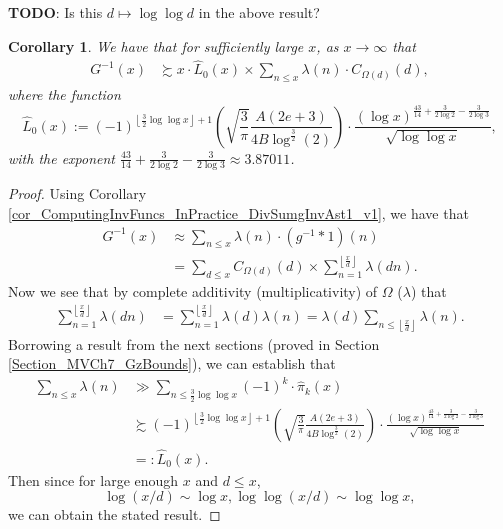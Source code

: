\documentclass[11pt,reqno,a4letter]{article}
\numberwithin{figure}{section}
\numberwithin{table}{section}
\newcommand{\floor}[1]{\left\lfloor #1 \right\rfloor}
\newcommand{\Floor}[2]{\ensuremath{\left\lfloor \frac{#1}{#2} \right\rfloor}}
\theoremstyle{plain}
\newtheorem{cor}[theorem]{Corollary}
\numberwithin{theorem}{section}
\theoremstyle{definition}
\begin{document}
\textbf{TODO}: Is this $d \mapsto \log\log d$ in the above result? 

\begin{cor} 
\label{cor_ASemiForm_ForGInvx_v1} 
We have that for sufficiently large $x$, as $x \rightarrow \infty$ that 
\begin{align*} 
G^{-1}(x) & \succsim x \cdot \widehat{L}_0(x) \times \sum_{n \leq x} 
     \lambda(n) \cdot C_{\Omega(d)}(d), 
\end{align*} 
where the function 
\[
\widehat{L}_0(x) := (-1)^{\floor{\frac{3}{2} \log\log x} + 1} \left( 
     \sqrt{\frac{3}{\pi}} \frac{A (2e+3)}{4B \log^{\frac{3}{2}}(2)}\right) \cdot 
     \frac{(\log x)^{\frac{43}{14} + \frac{3}{2 \log 2} - \frac{3}{2 \log 3}}}{ 
     \sqrt{\log\log x}}, 
\]
with the exponent $\frac{43}{14} + \frac{3}{2 \log 2} - \frac{3}{2 \log 3} \approx 3.87011$. 
\end{cor} 
\begin{proof} 
Using Corollary \ref{cor_ComputingInvFuncs_InPractice_DivSumgInvAst1_v1}, we have that 
\begin{align*} 
G^{-1}(x) & \approx \sum_{n \leq x} \lambda(n) \cdot (g^{-1} \ast 1)(n) \\ 
     & = \sum_{d \leq x} C_{\Omega(d)}(d) \times \sum_{n=1}^{\Floor{x}{d}} \lambda(dn). 
\end{align*} 
Now we see that by complete additivity (multiplicativity) of $\Omega$ ($\lambda$) that 
\begin{align*} 
\sum_{n=1}^{\Floor{x}{d}} \lambda(dn) & = \sum_{n=1}^{\Floor{x}{d}} \lambda(d) \lambda(n) 
     = \lambda(d) \sum_{n \leq \Floor{x}{d}} \lambda(n). 
\end{align*} 
Borrowing a result from the next sections 
(proved in Section \ref{Section_MVCh7_GzBounds}), 
we can establish that 
\begin{align*} 
\sum_{n \leq x} \lambda(n) & \gg \sum_{n \leq \frac{3}{2} \log\log x} (-1)^k \cdot \widehat{\pi}_k(x) \\ 
     & \succsim (-1)^{\floor{\frac{3}{2} \log\log x} + 1} \left( 
     \sqrt{\frac{3}{\pi}} \frac{A (2e+3)}{4B \log^{\frac{3}{2}}(2)}\right) \cdot 
     \frac{(\log x)^{\frac{43}{14} + \frac{3}{2 \log 2} - \frac{3}{2 \log 3}}}{ 
     \sqrt{\log\log x}} \\ 
     & =: \widehat{L}_0(x). 
\end{align*} 
Then since for large enough $x$ and $d \leq x$, 
\[
\log(x/d) \sim \log x, \log\log(x/d) \sim \log\log x, 
\] 
we can obtain the stated result. 
\end{proof} 
\end{document}
